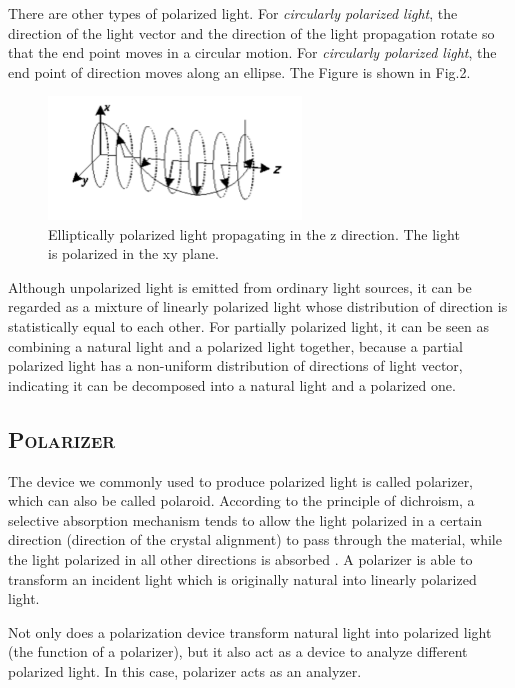 \documentclass[a4paper,12pt]{article}
\begin{document}
There are other types of polarized light. For \textit{circularly polarized light}, the direction of the light vector and the direction of the light propagation rotate so that the end point moves in a circular motion. For \textit{circularly polarized light}, the end point of direction moves along an ellipse. The Figure is shown in Fig.2.

\begin{figure}[h] 
    \centering
    \includegraphics[width=0.6\textwidth]{Fig2} 
    \caption{Elliptically polarized light propagating in the z direction. The light is polarized in the xy plane. \cite{labmanual}} 
\end{figure}

Although unpolarized light is emitted from ordinary light sources, it can be regarded as a mixture of linearly polarized light whose distribution of direction is statistically equal to each other. For partially polarized light, it can be seen as combining a natural light and a polarized light together, because a partial polarized light has a non-uniform distribution of directions of light vector, indicating it can be decomposed into a natural light and a polarized one.

\subsection{\textsc{Polarizer}}
The device we commonly used to produce polarized light is called polarizer, which can also be called polaroid. According to the principle of dichroism, a selective absorption mechanism tends to allow the light polarized in a certain direction (direction of the crystal alignment) to pass through the material, while the light polarized in all other directions is absorbed \cite{labmanual}. A polarizer is able to transform an incident light which is originally natural into linearly polarized light.

\par Not only does a polarization device transform natural light into polarized light (the function of a polarizer), but it also act as a device to analyze different polarized light. In this case, polarizer acts as an analyzer.  
\end{document}
